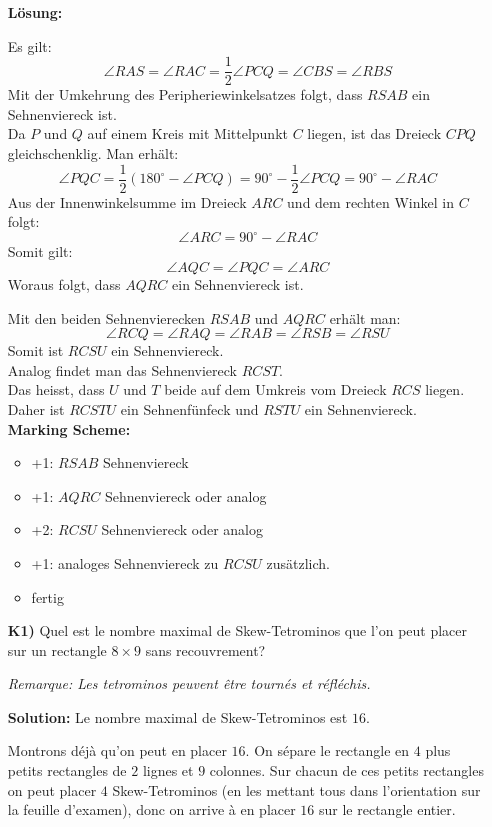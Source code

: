 \documentclass[language=german,style=solution]{smo}
\begin{document}
\begin{enumerate}
\textbf{Lösung:}

Es gilt:
\[
\angle RAS = \angle RAC = \frac{1}{2}  \angle PCQ = \angle CBS = \angle RBS
\]
Mit der Umkehrung des Peripheriewinkelsatzes folgt, dass $RSAB$ ein Sehnenviereck ist.\\

Da $P$ und $Q$ auf einem Kreis mit Mittelpunkt $C$ liegen, ist das Dreieck $CPQ$ gleichschenklig. Man erhält:
\[
\angle PQC = \frac{1}{2} (180^{\circ} - \angle PCQ) = 90^{\circ} - \frac{1}{2} \angle PCQ = 90^{\circ} - \angle RAC
\]
Aus der Innenwinkelsumme im Dreieck $ARC$ und dem rechten Winkel in $C$ folgt:
\[
\angle ARC = 90^{\circ} - \angle RAC
\]
Somit gilt:
\[
\angle AQC = \angle PQC = \angle ARC
\]
Woraus folgt, dass $AQRC$ ein Sehnenviereck ist.

Mit den beiden Sehnenvierecken $RSAB$ und $AQRC$ erhält man:
\[
\angle RCQ = \angle RAQ = \angle RAB = \angle RSB = \angle RSU
\]
Somit ist $RCSU$ ein Sehnenviereck.\\

Analog findet man das Sehnenviereck $RCST$.\\
Das heisst, dass $U$ und $T$ beide auf dem Umkreis vom Dreieck $RCS$ liegen. Daher ist $RCSTU$ ein Sehnenfünfeck und $RSTU$ ein Sehnenviereck.\\

\textbf{Marking Scheme:}
\begin{itemize}
\item +1: $RSAB$ Sehnenviereck
\item +1: $AQRC$ Sehnenviereck oder analog
\item +2: $RCSU$ Sehnenviereck oder analog
\item +1: analoges Sehnenviereck zu $RCSU$ zusätzlich.
\item fertig
\end{itemize}

\newpage %

\item[\textbf{K1)}] 
Quel est le nombre maximal de Skew-Tetrominos que l'on peut placer sur un rectangle $8 \times 9$ sans recouvrement?

\textit{Remarque: Les tetrominos peuvent être tournés et réfléchis.}

\textbf{Solution:}
Le nombre maximal de Skew-Tetrominos est $16$.
	
Montrons déjà qu'on peut en placer $16$. On sépare le rectangle en $4$ plus petits rectangles de $2$ lignes et $9$ colonnes. Sur chacun de ces petits rectangles on peut placer $4$ Skew-Tetrominos (en les mettant tous dans l'orientation sur la feuille d'examen), donc on arrive à en placer $16$ sur le rectangle entier.
	

\end{enumerate}
\end{document}
